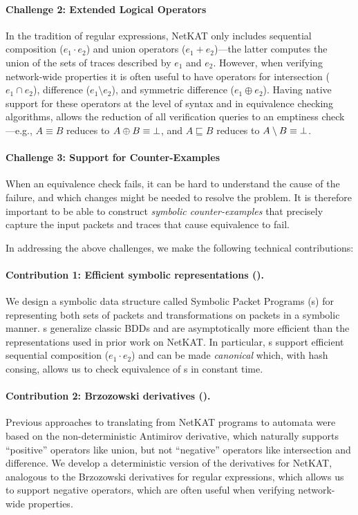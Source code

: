 \documentclass[acmsmall,dvipsnames,nonacm]{acmart}
\begin{document}
\paragraph{Challenge 2: Extended Logical Operators}
%
In the tradition of regular expressions, NetKAT only includes
sequential composition ($e_1 \cdot e_2$) and union operators ($e_1 +
e_2$)---the latter computes the union of the sets of traces described
by $e_1$ and $e_2$. However, when verifying network-wide properties it
is often useful to have operators for intersection ($e_1 \cap e_2$),
difference ($e_1 \setminus e_2$), and symmetric difference ($e_1
\oplus e_2$). Having native support for these operators at the level
of syntax and in equivalence checking algorithms, allows the reduction
of all verification queries to an emptiness check---e.g., $A \equiv B$
reduces to $A \oplus B \equiv \bot$, and $A \sqsubseteq B$ reduces to
$A \setminus B \equiv \bot$.

\paragraph{Challenge 3: Support for Counter-Examples}
%
When an equivalence check fails, it can be hard to understand the
cause of the failure, and which changes might be needed to resolve the
problem. It is therefore important to be able to construct
\emph{symbolic counter-examples} that precisely capture the input
packets and traces that cause equivalence to fail.

\medskip
In addressing the above challenges, we make the following technical
contributions:

\paragraph{\textbf{Contribution 1: Efficient symbolic representations} ().}
%
We design a symbolic data structure called Symbolic Packet Programs
(\SPPn{}s) for representing both sets of packets and transformations
on packets in a symbolic manner. \SPPn{}s generalize classic BDDs and
are asymptotically more efficient than the representations used in
prior work on NetKAT. In particular, \SPPn{}s support efficient
sequential composition ($e_1 \cdot e_2$) and can be made
\emph{canonical} which, with hash consing, allows us to check
equivalence of \SPPn{}s in constant time.

\paragraph{\textbf{Contribution 2: Brzozowski derivatives} ().}
%
Previous approaches to translating from NetKAT programs to automata
were based on the non-deterministic Antimirov derivative, which
naturally supports ``positive'' operators like union, but not
``negative'' operators like intersection and difference. We develop a
deterministic version of the derivatives for NetKAT, analogous to the
Brzozowski derivatives for regular expressions, which allows us to
support negative operators, which are often useful when verifying
network-wide properties.
\end{document}

